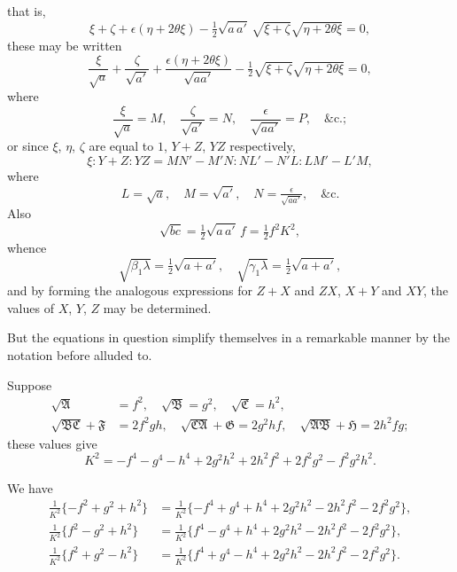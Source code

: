 \documentclass[11pt,a4paper]{book}
\begin{document}
that is,
\[
\xi + \zeta + \epsilon(\eta+2\theta\xi) - \tfrac{1}{2}\sqrt{a\,a'}\,\sqrt{\xi+\zeta}\sqrt{\eta+2\theta\xi} = 0,
\]
these may be written
\[
\frac{\xi}{\sqrt{a}} + \frac{\zeta}{\sqrt{a'}} + \frac{\epsilon(\eta+2\theta\xi)}{\sqrt{aa'}} - \tfrac{1}{2}\sqrt{\xi+\zeta}\sqrt{\eta+2\theta\xi} = 0,
\]
where
\[
\frac{\xi}{\sqrt{a}} = M, \quad \frac{\zeta}{\sqrt{a'}} = N, \quad \frac{\epsilon}{\sqrt{aa'}} = P, \quad \&\text{c.};
\]
or since $\xi$, $\eta$, $\zeta$ are equal to $1$, $Y+Z$, $YZ$ respectively,
\[
\xi : Y+Z : YZ = MN'-M'N : NL'-N'L : LM'-L'M,
\]
where
\[
L = \sqrt{a}, \quad M = \sqrt{a'}, \quad N = \tfrac{\epsilon}{\sqrt{aa'}}, \quad \&\text{c.}
\]
Also
\[
\sqrt{bc} = \tfrac{1}{2}\sqrt{a\,a'}\,f = \tfrac{1}{2}f^2K^2,
\]
whence
\[
\sqrt{\beta_1\lambda} = \tfrac{1}{2}\sqrt{a+a'}, \quad \sqrt{\gamma_1\lambda} = \tfrac{1}{2}\sqrt{a+a'},
\]
and by forming the analogous expressions for $Z+X$ and $ZX$, $X+Y$ and $XY$, the values of $X$, $Y$, $Z$ may be determined.

But the equations in question simplify themselves in a remarkable manner by the notation before alluded to.

\newpage
\setcounter{page}{76}

Suppose
\begin{align*}
\sqrt{\mathfrak{A}} &= f^2, \quad \sqrt{\mathfrak{B}} = g^2, \quad \sqrt{\mathfrak{C}} = h^2,\\
\sqrt{\mathfrak{B}\mathfrak{C}}+\mathfrak{F} &= 2f^2gh, \quad \sqrt{\mathfrak{C}\mathfrak{A}}+\mathfrak{G} = 2g^2hf, \quad \sqrt{\mathfrak{A}\mathfrak{B}}+\mathfrak{H} = 2h^2fg;
\end{align*}
these values give
\[
K^2 = -f^4-g^4-h^4+2g^2h^2+2h^2f^2+2f^2g^2-f^2g^2h^2.
\]

We have
\begin{align*}
\tfrac{1}{K^2}\{-f^2+g^2+h^2\} &= \tfrac{1}{K^2}\{-f^4+g^4+h^4+2g^2h^2-2h^2f^2-2f^2g^2\},\\
\tfrac{1}{K^2}\{f^2-g^2+h^2\} &= \tfrac{1}{K^2}\{f^4-g^4+h^4+2g^2h^2-2h^2f^2-2f^2g^2\},\\
\tfrac{1}{K^2}\{f^2+g^2-h^2\} &= \tfrac{1}{K^2}\{f^4+g^4-h^4+2g^2h^2-2h^2f^2-2f^2g^2\}.
\end{align*}
\end{document}
